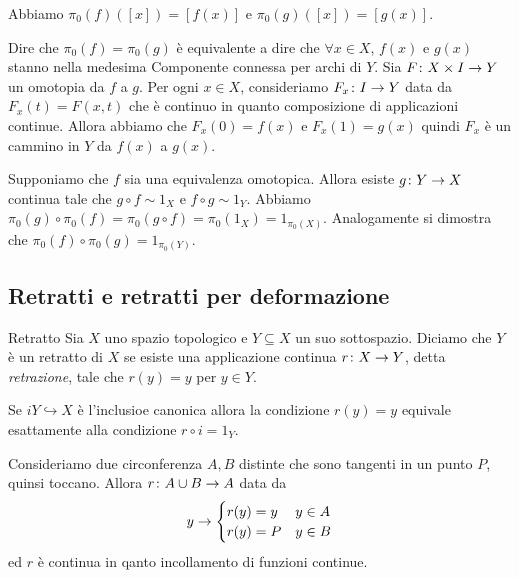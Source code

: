 \documentclass[a4paper]{article}
\begin{document}
\begin{snippetproof}{}
    Abbiamo \(\pi_0(f)([x]) = [f(x)]\)
    e \(\pi_0(g)([x]) = [g(x)]\).
    \begin{iffproof}
        \item Dire che \(\pi_0(f) = \pi_0(g)\)
        è equivalente a dire che \(\forall x \in X\),
        \(f(x)\) e \(g(x)\) stanno nella medesima Componente
        connessa per archi di \(Y\).
        Sia \(F \colon X \times I \to Y\) un omotopia da
        \(f\) a \(g\).
        Per ogni \(x \in X\), consideriamo
        \(F_x \colon I \to Y\)
        data da \(F_x(t) = F(x,t)\)
        che è continuo in quanto composizione di applicazioni continue.
        Allora abbiamo che \(F_x(0) = f(x)\)
        e \(F_x(1) = g(x)\) quindi \(F_x\)
        è un cammino in \(Y\) da \(f(x)\) a \(g(x)\).
        \item Supponiamo che \(f\) sia una equivalenza omotopica.
        Allora esiste \(g \colon Y \to X\) continua tale che
        \(g \circ f \sim 1_X\) e \(f \circ g \sim 1_Y\).
        Abbiamo \(\pi_0(g) \circ \pi_0(f) = \pi_0(g \circ f) = \pi_0(1_X) = 1_{\pi_0(X)}\).
        Analogamente si dimostra che \(\pi_0(f) \circ \pi_0(g) = 1_{\pi_0(Y)}\).
    \end{iffproof}
\end{snippetproof}

\subsection{Retratti e retratti per deformazione}

\begin{snippetdefinition}{Retratto}
    Sia \(X\) uno spazio topologico
    e \(Y \subseteq X\) un suo sottospazio.
    Diciamo che \(Y\) è un retratto di \(X\)
    se esiste una applicazione continua \(r \colon X \to Y\),
    detta \emph{retrazione}, tale che \(r(y) = y\)
    per \(y\in Y\).
\end{snippetdefinition}

Se \(i Y \hookrightarrow X\) è l'inclusioe canonica
allora la condizione \(r(y) = y\)
equivale esattamente alla condizione \(r \circ i = 1_Y\).

\begin{snippetexample}{}
    Consideriamo due circonferenza \(A, B\)
    distinte che sono tangenti in un punto \(P\),
    quinsi toccano. Allora \(r \colon A \cup B \to A\)
    data da \[
        y \to \begin{cases}
            r(y) = y & y \in A \\
            r(y) = P & y \in B
        \end{cases}
    \]
    ed \(r\) è continua in qanto incollamento di funzioni continue.
\end{snippetexample}
\end{document}
